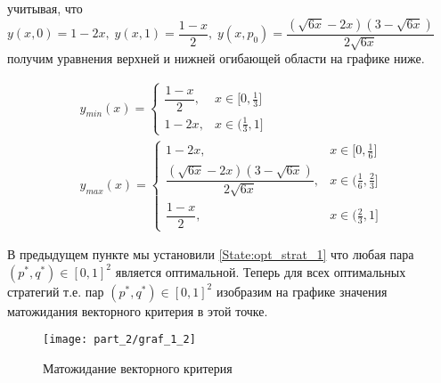 учитывая, что
$
	y(x, 0) = 1 - 2x, \;
	y(x, 1) = \dfrac{1 - x}{2}, \;  	
	y(x, p_0) = \dfrac{(\sqrt{6x} - 2x)(3 - \sqrt{6x})}{2 \sqrt{6x}}
$
получим уравнения верхней и нижней огибающей области на графике ниже.

\begin{gather*}
	y_{min}(x) =
	\begin{cases}
		\dfrac{1 - x}{2}, & x \in \big[0, \frac{1}{3} \big] 
		\\
		1 - 2x, & x \in \big( \frac{1}{3}, 1\big]
	\end{cases}
	\\
	y_{max}(x) =
	\begin{cases}
		1 - 2x, & x \in \big[0, \frac{1}{6} \big] 
		\\
		\dfrac{(\sqrt{6x} - 2x)(3 - \sqrt{6x})}{2 \sqrt{6x}}, &
		x \in \big(\frac{1}{6}, \frac{2}{3} \big]
		\\
		\dfrac{1 - x}{2}, & x \in \big(\frac{2}{3}, 1 \big]
	\end{cases}
\end{gather*}


В предыдущем пункте мы установили \eqref{State:opt_strat_1} что любая пара
$(p^{*}, q^{*}) \in [0, 1]^{2}$ является оптимальной. Теперь для всех
оптимальных стратегий т.е. пар $(p^{*}, q^{*}) \in [0, 1]^{2}$ изобразим на графике
значения матожидания векторного критерия в этой точке.

\begin{figure}[H]
	\centering
	\texttt{[image: part\_2/graf\_1\_2]}
	\caption{Матожидание векторного критерия}
\end{figure}
